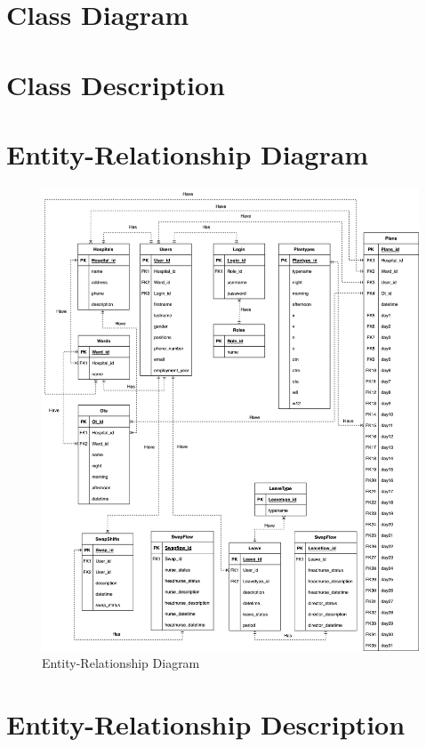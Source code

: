 \section{Class Diagram}

\section{Class Description}
\clearpage

\section{Entity-Relationship Diagram}

\begin{figure}[h!]
    \centering
    \includegraphics[width=1\textwidth]{ER.png}
    \caption{Entity-Relationship Diagram}
    \label{fig:ERD}
\end{figure}
\clearpage



\section{Entity-Relationship Description}

